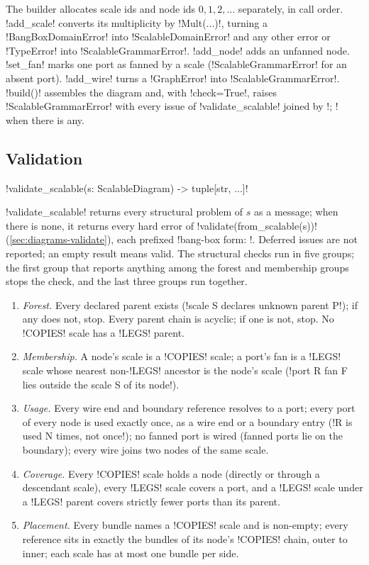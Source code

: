 The builder allocates scale ids and node ids $0,1,2,\ldots$ separately, in call order. \py!add_scale! converts its multiplicity by \py!Mult(...)!, turning a \py!BangBoxDomainError! into \py!ScalableDomainError! and any other \bbox{} error or \py!TypeError! into \py!ScalableGrammarError!. \py!add_node! adds an unfanned node. \py!set_fan! marks one port as fanned by a scale (\py!ScalableGrammarError! for an absent port). \py!add_wire! turns a \py!GraphError! into \py!ScalableGrammarError!. \py!build()! assembles the diagram and, with \py!check=True!, raises \py!ScalableGrammarError! with every issue of \py!validate_scalable! joined by \code!; ! when there is any.

\subsection{Validation}

\begin{signature}
\py!validate_scalable(s: ScalableDiagram) -> tuple[str, ...]!
\end{signature}

\py!validate_scalable! returns every structural problem of $s$ as a message; when there is none, it returns every hard error of \py!validate(from_scalable(s))! (\cref{sec:diagrams-validate}), each prefixed \code!bang-box form: !. Deferred issues are not reported; an empty result means valid. The structural checks run in five groups; the first group that reports anything among the forest and membership groups stops the check, and the last three groups run together.

\begin{enumerate}
\item \emph{Forest.} Every declared parent exists (\code!scale S declares unknown parent P!); if any does not, stop. Every parent chain is acyclic; if one is not, stop. No \code!COPIES! scale has a \code!LEGS! parent.
\item \emph{Membership.} A node's scale is a \code!COPIES! scale; a port's fan is a \code!LEGS! scale whose nearest non-\code!LEGS! ancestor is the node's scale (\code!port R fan F lies outside the scale S of its node!).
\item \emph{Usage.} Every wire end and boundary reference resolves to a port; every port of every node is used exactly once, as a wire end or a boundary entry (\code!R is used N times, not once!); no fanned port is wired (fanned ports lie on the boundary); every wire joins two nodes of the same scale.
\item \emph{Coverage.} Every \code!COPIES! scale holds a node (directly or through a descendant scale), every \code!LEGS! scale covers a port, and a \code!LEGS! scale under a \code!LEGS! parent covers strictly fewer ports than its parent.
\item \emph{Placement.} Every bundle names a \code!COPIES! scale and is non-empty; every reference sits in exactly the bundles of its node's \code!COPIES! chain, outer to inner; each scale has at most one bundle per side.
\end{enumerate}

